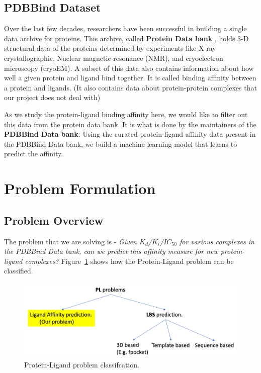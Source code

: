 \documentclass[11pt]{article}
\begin{document}
\subsection{PDBBind Dataset}
Over the last few decades, researchers have been successful in building a single data archive for proteins.  This archive, called \textbf{Protein Data bank} \cite{pdb_homepage} , holds 3-D structural data of the proteins determined by experiments like X-ray crystallographic, Nuclear magnetic resonance (NMR), and cryoelectron microscopy (cryoEM).  A subset of this data also contains information about how well a given protein and ligand bind together.  It is called binding affinity between a protein and ligands.  (It also contains data about protein-protein complexes that our project does not deal with)
\cite{pdbank_history}

As we study the protein-ligand binding affinity here, we would like to filter out this data from the protein data bank.  It is what is done by the maintainers of the \textbf{PDBBind Data bank}.
\cite{pdbbind_introduction}
Using the curated protein-ligand affinity data present in the PDBBind Data bank, we build a machine learning model that learns to predict the affinity. 

\section{Problem Formulation}
\subsection{Problem Overview}
The problem that we are solving is - \textit{Given $K_d$/$K_i$/$IC_{50}$ for various complexes in the PDBBind Data bank,
can we predict this affinity measure for new protein-ligand complexes?}
Figure~\ref{fig:plproblemclassification} shows how the Protein-Ligand problem can be classified.

\begin{figure}[htb]
  \centering
    \includegraphics[scale=0.35]{images/pl_problem_classification}
    \caption{Protein-Ligand problem classifcation.}
    \label{fig:plproblemclassification}
\end{figure}
\end{document}
